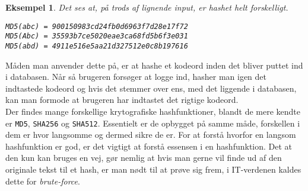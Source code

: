 \documentclass[a4paper, 12pt]{article}
\theoremstyle{break}
\newtheorem{eks}[definition]{Eksempel}
\theoremstyle{breakline}
\theoremstyle{beviser}
\begin{document}
    \begin{eks}
        Det ses at, på trods af lignende input, er hashet helt forskelligt.
        \begin{center}
            \texttt{MD5(abc) = 900150983cd24fb0d6963f7d28e17f72}\\
            \texttt{MD5(Abc) = 35593b7ce5020eae3ca68fd5b6f3e031}\\
            \texttt{MD5(abd) = 4911e516e5aa21d327512e0c8b197616}\\
        \end{center}
        \label{eks:hash}

    \end{eks}

    \noindent
    Måden man anvender dette på, er at hashe et kodeord inden det bliver puttet ind i databasen.
    Når så brugeren forsøger at logge ind, hasher man igen det indtastede kodeord og hvis det stemmer over ens, med det liggende i databasen, kan man formode at brugeren har indtastet det rigtige kodeord.
    \\

    Der findes mange forskellige krytografiske hashfunktioner, blandt de mere kendte er \texttt{MD5}, \texttt{SHA256} og \texttt{SHA512}.
    Essentielt er de opbygget på samme måde, forskellen i dem er hvor langsomme og dermed sikre de er.
    For at forstå hvorfor en langsom hashfunktion er god, er det vigtigt at forstå essensen i en hashfunktion.
    Det at den kun kan bruges en vej, gør nemlig at hvis man gerne vil finde ud af den originale tekst til et hash, er man nødt til at prøve sig frem, i IT-verdenen kaldes dette for \emph{brute-force}.
\end{document}
